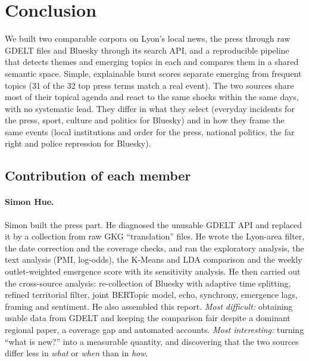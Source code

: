\documentclass[pdflatex,sn-mathphys-num]{sn-jnl}
\begin{document}
\section{Conclusion}\label{sec:conclusion}

We built two comparable corpora on Lyon's local news, the press through raw GDELT files and Bluesky through its search API, and a reproducible pipeline that detects themes and emerging topics in each and compares them in a shared semantic space. Simple, explainable burst scores separate emerging from frequent topics (31 of the 32 top press terms match a real event). The two sources share most of their topical agenda and react to the same shocks within the same days, with no systematic lead. They differ in what they select (everyday incidents for the press, sport, culture and politics for Bluesky) and in how they frame the same events (local institutions and order for the press, national politics, the far right and police repression for Bluesky).

\subsection*{Contribution of each member}

\paragraph{Simon Hue.} Simon built the press part. He diagnosed the unusable GDELT API and replaced it by a collection from raw GKG ``translation'' files. He wrote the Lyon-area filter, the date correction and the coverage checks, and ran the exploratory analysis, the text analysis (PMI, log-odds), the K-Means and LDA comparison and the weekly outlet-weighted emergence score with its sensitivity analysis. He then carried out the cross-source analysis: re-collection of Bluesky with adaptive time splitting, refined territorial filter, joint BERTopic model, echo, synchrony, emergence lags, framing and sentiment. He also assembled this report. \emph{Most difficult:} obtaining usable data from GDELT and keeping the comparison fair despite a dominant regional paper, a coverage gap and automated accounts. \emph{Most interesting:} turning ``what is new?'' into a measurable quantity, and discovering that the two sources differ less in \emph{what} or \emph{when} than in \emph{how}.
\end{document}
